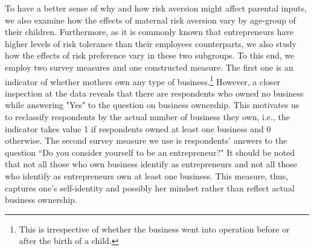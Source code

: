 \documentclass[emulatestandardclasses, 10pt, abstract = true]{scrartcl}
\begin{document}
To have a better sense of why and how risk aversion might affect parental inputs, we also examine how the effects of maternal risk aversion vary by age-group of their children. Furthermore, as it is commonly known that entrepreneurs have higher levels of risk tolerance than their employees counterparts, we also study how the effects of risk preference vary in these two subgroups. To this end, we employ two survey measures and one constructed measure. The first one is an indicator of whether mothers own any type of business.\footnote{This is irrespective of whether the business went into operation before or after the birth of a child.} However, a closer inspection at the data reveals that there are respondents who owned no business while answering "Yes" to the question on business ownership. This motivates us to reclassify respondents by the actual number of business they own, i.e., the indicator takes value 1 if respondents owned at least one business and 0 otherwise. The second survey measure we use is respondents' answers to the question ``Do you consider yourself to be an entrepreneur?" It should be noted that not all those who own business identify as entrepreneurs and not all those who identify as entrepreneurs own at least one business. This measure, thus, captures one's self-identity and possibly her mindset rather than reflect actual business ownership.


\end{document}
